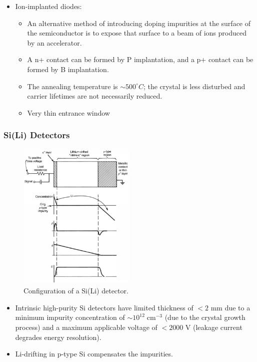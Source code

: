 \begin{itemize}
\begin{itemize}
    \end{itemize}
    \item Ion-implanted diodes:
    \begin{itemize}
        \item An alternative method of introducing doping impurities at the surface of the semiconductor is to expose that surface to a beam of ions produced by an accelerator. 
        \item A n+ contact can be formed by P implantation, and a p+ contact can be formed by B implantation.
        \item The annealing temperature is $\sim500^\circ C$; the crystal is less disturbed and carrier lifetimes are not necessarily reduced. 
        \item Very thin entrance window
    \end{itemize}
\end{itemize}
\subsubsection{Si(Li) Detectors}
\begin{figure}[ht]
    \centering
    \includegraphics[width=0.5\textwidth]{images/SiLi_Detector.png}
    \caption{Configuration of a Si(Li) detector.}
    \label{fig:SiLi_Detector}
\end{figure}
\begin{itemize}
    \item Intrinsic high-purity Si detectors have limited thickness of $<2$ mm due to a minimum impurity concentration of $\sim10^{12}\;\text{cm}^{-3}$ (due to the crystal growth process) and a maximum applicable voltage of $<2000$ V (leakage current degrades energy resolution). 
    \item Li-drifting in p-type Si compensates the impurities. 
\end{itemize}
